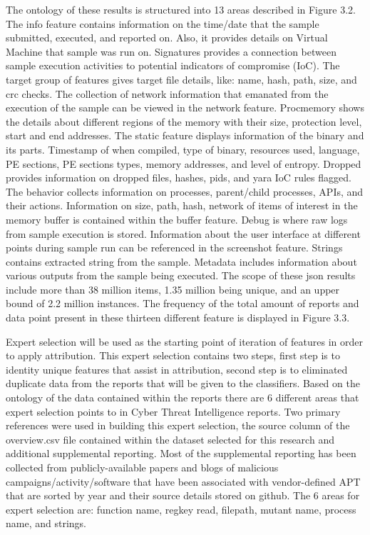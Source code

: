 \documentclass[12pt]{report}
\begin{document}
The ontology of these results is structured into 13 areas described in Figure 3.2.  The info feature contains information on the time/date that the sample submitted, executed, and reported on.  Also, it provides details on Virtual Machine that sample was run on.  Signatures provides a connection between sample execution activities to potential indicators of compromise (IoC).  The target group of features gives target file details, like: name, hash, path, size, and crc checks.  The collection of network information that emanated from the execution of the sample can be viewed in the network feature.  Procmemory shows the details about different regions of the memory with their size, protection level, start and end addresses.  The static feature displays information of the binary and its parts.  Timestamp of when compiled, type of binary, resources used, language, PE sections, PE sections types, memory addresses, and level of entropy.  Dropped provides information on dropped files, hashes, pids, and yara IoC rules flagged.  The behavior collects information on processes, parent/child processes, APIs, and their actions.  Information on size, path, hash, network of items of interest in the memory buffer is contained within the buffer feature.  Debug is where raw logs from sample execution is stored.  Information about the user interface at different points during sample run can be referenced in the screenshot feature.  Strings contains extracted string from the sample.  Metadata includes information about various outputs from the sample being executed.  The scope of these json results include more than 38 million items, 1.35 million being unique, and an upper bound of 2.2 million instances.  The frequency of the total amount of reports and data point present in these thirteen different feature is displayed in Figure 3.3.

Expert selection will be used as the starting point of iteration of features in order to apply attribution.  This expert selection contains two steps, first step is to identity unique features that assist in attribution, second step is to eliminated duplicate data from the reports that will be given to the classifiers.  Based on the ontology of the data contained within the reports there are 6 different areas that expert selection points to in Cyber Threat Intelligence reports.  Two primary references were used in building this expert selection, the source column of the overview.csv file contained within the dataset selected for this research and additional supplemental reporting.  Most of the supplemental reporting has been collected from publicly-available papers and blogs of malicious campaigns/activity/software that have been associated with vendor-defined APT that are sorted by year and their source details stored on github. \cite{APTnotes}  The 6 areas for expert selection are: function name, regkey read, filepath, mutant name, process name, and strings.
\end{document}
